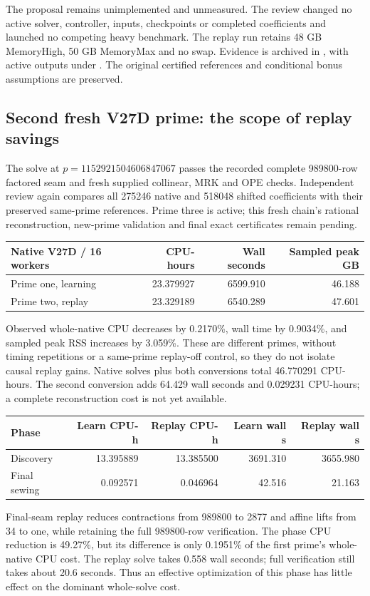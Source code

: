 \documentclass[11pt]{article}
\begin{document}
The proposal remains unimplemented and unmeasured. The review changed no
active solver, controller, inputs, checkpoints or completed coefficients and
launched no competing heavy benchmark. The replay run retains 48 GB
MemoryHigh, 50 GB MemoryMax and no swap. Evidence is archived in
, with active outputs under
. The original certified references
and conditional bonus assumptions are preserved.

\subsection{Second fresh V27D prime: the scope of replay savings}
The solve at $p=1152921504606847067$ passes the recorded complete
989800-row factored seam and fresh supplied collinear, MRK and OPE checks.
Independent review again compares all 275246 native and 518048 shifted
coefficients with their preserved same-prime references. Prime three is
active; this fresh chain's rational reconstruction, new-prime validation
and final exact certificates remain pending.

\begin{center}
\begin{tabular}{lrrr}\toprule
Native V27D / 16 workers & CPU-hours & Wall seconds & Sampled peak GB\\\midrule
Prime one, learning & 23.379927 & 6599.910 & 46.188\\
Prime two, replay & 23.329189 & 6540.289 & 47.601\\
\bottomrule
\end{tabular}
\end{center}
Observed whole-native CPU decreases by 0.2170\%, wall time by 0.9034\%,
and sampled peak RSS increases by 3.059\%. These are different primes,
without timing repetitions or a same-prime replay-off control, so they do
not isolate causal replay gains. Native solves plus both conversions total
46.770291 CPU-hours. The second conversion adds 64.429 wall seconds and
0.029231 CPU-hours; a complete reconstruction cost is not yet available.

\begin{center}
\begin{tabular}{lrrrr}\toprule
Phase & Learn CPU-h & Replay CPU-h & Learn wall s & Replay wall s\\\midrule
Discovery & 13.395889 & 13.385500 & 3691.310 & 3655.980\\
Final sewing & 0.092571 & 0.046964 & 42.516 & 21.163\\
\bottomrule
\end{tabular}
\end{center}
Final-seam replay reduces contractions from 989800 to 2877 and affine
lifts from 34 to one, while retaining the full 989800-row verification.
The phase CPU reduction is 49.27\%, but its difference is only 0.1951\%
of the first prime's whole-native CPU cost. The replay solve takes
0.558 wall seconds; full verification still takes about 20.6 seconds.
Thus an effective optimization of this phase has little effect on the
dominant whole-solve cost.
\end{document}
